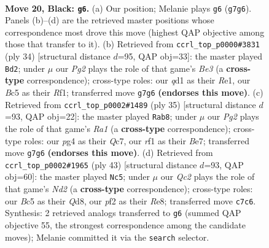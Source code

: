\documentclass[11pt]{article}
\begin{document}
\clearpage

\begin{figure}[p]\centering
\begin{subfigure}{0.46\textwidth}\centering
\resizebox{\linewidth}{!}{%
\newchessgame
\chessboard[
  setfen={rn4k1/ppq1r1pp/4p3/P1bB4/6PP/1N6/1P3P2/R1BQ1RK1 b - - 0 20},
  showmover=false,
  pgfstyle=straightmove, color=movearrow, markmove={g7-g6}
]}
\caption{}
\end{subfigure}\hfill
\begin{subfigure}{0.46\textwidth}\centering
\resizebox{\linewidth}{!}{%
\newchessgame
\chessboard[
  setfen={4rr1k/pppqb1pp/2np4/3Q4/3PN3/4B3/PPP3PP/4RRK1 w - - 6 18},
  showmover=false,
  pgfstyle=straightmove, color=movearrow, markmove={e3-d2}
]}
\caption{}
\end{subfigure}
\\[4pt]
\begin{subfigure}{0.46\textwidth}\centering
\resizebox{\linewidth}{!}{%
\newchessgame
\chessboard[
  setfen={r4r1k/ppq1bpp1/4b2p/4n3/2P1BB2/P7/2Q1NPPP/1R3RK1 b - - 3 18},
  showmover=false,
  pgfstyle=straightmove, color=movearrow, markmove={a8-b8}
]}
\caption{}
\end{subfigure}\hfill
\begin{subfigure}{0.46\textwidth}\centering
\resizebox{\linewidth}{!}{%
\newchessgame
\chessboard[
  setfen={r2qr1k1/pp1n1pp1/7p/3NpP2/3b4/PQ2B2P/1P3PP1/R2R2K1 b - - 4 22},
  showmover=false,
  pgfstyle=straightmove, color=movearrow, markmove={d7-c5}
]}
\caption{}
\end{subfigure}
\caption{\textbf{Move 20, Black: \texttt{g6}.} (a) Our position; Melanie plays \texttt{g6} (\texttt{g7g6}). Panels (b)--(d) are the retrieved master positions whose correspondence most drove this move (highest QAP objective among those that transfer to it). (b) Retrieved from \texttt{ccrl\_top\_p0000\#3831} (ply 34) [structural distance $d$=95, QAP obj=33]: the master played \texttt{Bd2}; under $\mu$ our \emph{Pg2} plays the role of that game's \emph{Be3} (a \textbf{cross-type} correspondence); cross-type roles: our \emph{q}d1 as their \emph{R}e1, our \emph{B}c5 as their \emph{R}f1; transferred move \texttt{g7g6} \textbf{(endorses this move)}. (c) Retrieved from \texttt{ccrl\_top\_p0002\#1489} (ply 35) [structural distance $d$=93, QAP obj=22]: the master played \texttt{Rab8}; under $\mu$ our \emph{Pg2} plays the role of that game's \emph{Ra1} (a \textbf{cross-type} correspondence); cross-type roles: our \emph{p}g4 as their \emph{Q}c7, our \emph{r}f1 as their \emph{B}e7; transferred move \texttt{g7g6} \textbf{(endorses this move)}. (d) Retrieved from \texttt{ccrl\_top\_p0002\#1965} (ply 43) [structural distance $d$=93, QAP obj=60]: the master played \texttt{Nc5}; under $\mu$ our \emph{Qc2} plays the role of that game's \emph{Nd2} (a \textbf{cross-type} correspondence); cross-type roles: our \emph{B}c5 as their \emph{Q}d8, our \emph{p}f2 as their \emph{R}e8; transferred move \texttt{c7c6}. Synthesis: 2 retrieved analogs transferred to \texttt{g6} (summed QAP objective 55, the strongest correspondence among the candidate moves); Melanie committed it via the \texttt{search} selector.}
\label{fig:thought-m39}
\end{figure}
\end{document}
